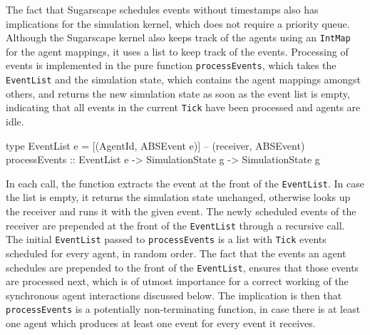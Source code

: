 The fact that Sugarscape schedules events without timestamps also has implications for the simulation kernel, which does not require a priority queue. Although the Sugarscape kernel also keeps track of the agents using an \texttt{IntMap} for the agent mappings, it uses a list to keep track of the events. Processing of events is implemented in the pure function \texttt{processEvents}, which takes the \texttt{EventList} and the simulation state, which contains the agent mappings amongst others, and returns the new simulation state as soon as the event list is empty, indicating that all events in the current \texttt{Tick} have been processed and agents are idle.

\begin{HaskellCode}
type EventList e = [(AgentId, ABSEvent e)] -- (receiver, ABSEvent)
processEvents :: EventList e -> SimulationState g -> SimulationState g
\end{HaskellCode}

In each call, the function extracts the event at the front of the \texttt{EventList}. In case the list is empty, it returns the simulation state unchanged, otherwise looks up the receiver and runs it with the given event. The newly scheduled events of the receiver are prepended at the front of the \texttt{EventList} through a recursive call. The initial \texttt{EventList} passed to \texttt{processEvents} is a list with \texttt{Tick} events scheduled for every agent, in random order. The fact that the events an agent schedules are prepended to the front of the \texttt{EventList}, ensures that those events are processed next, which is of utmost importance for a correct working of the synchronous agent interactions discussed below. The implication is then that \texttt{processEvents} is a potentially non-terminating function, in case there is at least one agent which produces at least one event for every event it receives.